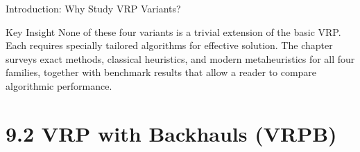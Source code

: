 \documentclass[aspectratio=169,10pt]{beamer}
\begin{document}
\begin{frame}[allowframebreaks]{Introduction: Why Study VRP Variants?}
\begin{alertblock}{Key Insight}
  None of these four variants is a trivial extension of the basic VRP.  Each
  requires specially tailored algorithms for effective solution.  The chapter
  surveys exact methods, classical heuristics, and modern metaheuristics for
  all four families, together with benchmark results that allow a reader to
  compare algorithmic performance.
\end{alertblock}

\end{frame}

\section{9.2 VRP with Backhauls (VRPB)}
\end{document}
